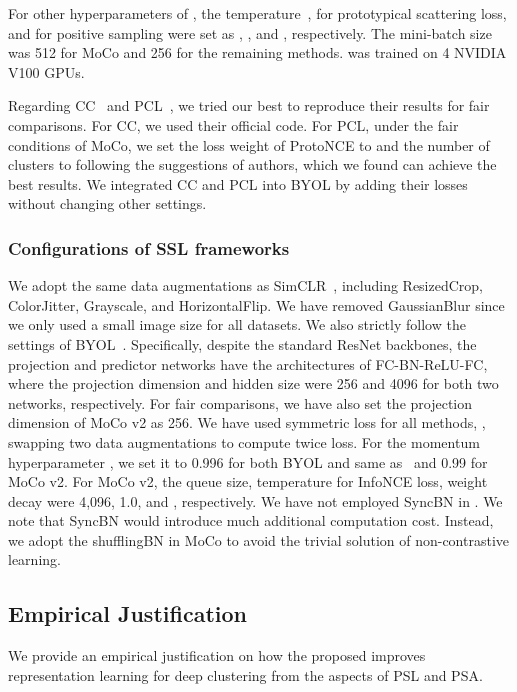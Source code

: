 For other hyperparameters of \methodname, the temperature~,  for prototypical scattering loss, and  for positive sampling were set as , , and , respectively. The mini-batch size was 512 for MoCo and 256 for the remaining methods. \methodname was trained on 4 NVIDIA V100 GPUs. 

Regarding CC~\cite{li2021contrastive} and PCL~\cite{li2020prototypical}, we tried our best to reproduce their results for fair comparisons. For CC, we used their official code. For PCL, under the fair conditions of MoCo, we set the loss weight of ProtoNCE to  and the number of clusters to  following the suggestions of authors, which we found can achieve the best results. We integrated CC and PCL into BYOL by adding their losses without changing other settings.

\subsubsection{Configurations of SSL frameworks}
We adopt the same data augmentations as SimCLR~\cite{chen2020simple}, including ResizedCrop, ColorJitter, Grayscale, and HorizontalFlip. We have removed GaussianBlur since we only used a small image size for all datasets. We also strictly follow the settings of BYOL~\cite{grill2020bootstrap}. Specifically, despite the standard ResNet backbones, the projection and predictor networks have the architectures of FC-BN-ReLU-FC, where the projection dimension and hidden size were 256 and 4096 for both two networks, respectively.
For fair comparisons, we have also set the projection dimension of MoCo v2 as 256. We have used symmetric loss for all methods,
\ie, swapping two data augmentations to compute twice loss. For the momentum hyperparameter , we set it to 0.996 for both BYOL and \methodname same as~\cite{grill2020bootstrap} and 0.99 for MoCo v2. For MoCo v2, the queue size, temperature for InfoNCE loss, weight decay were 4,096, 1.0, and , respectively. We have not employed SyncBN in \methodname. We note that SyncBN would introduce much additional computation cost. Instead, we adopt the shufflingBN in MoCo to avoid the trivial solution of non-contrastive learning. 

\subsection{Empirical Justification}
\label{sec:justification}

We provide an empirical justification on how the proposed \methodname improves representation learning for deep clustering from the aspects of PSL and PSA.


